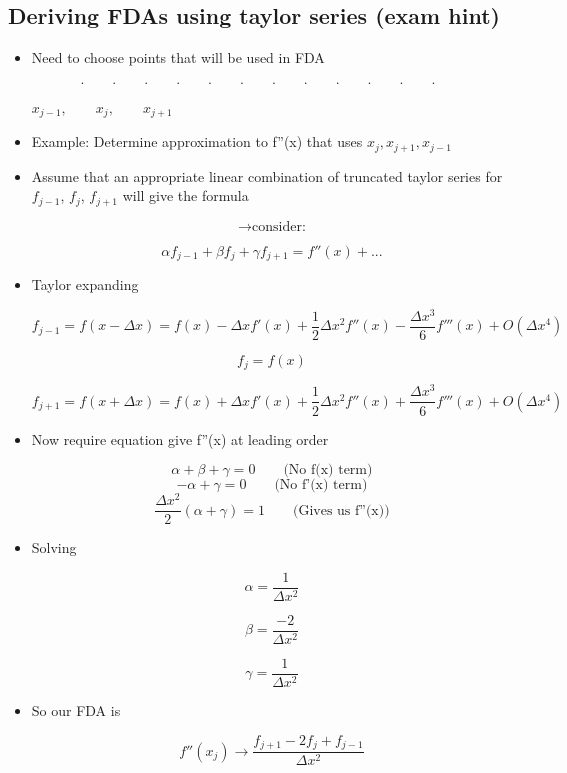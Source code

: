 \subsection{Deriving FDAs using taylor series (exam hint)}
\begin{itemize}
    \item Need to choose points that will be used in FDA

    \[ . \qquad . \qquad . \qquad . \qquad . \qquad . \qquad . \qquad . \qquad . \qquad . \qquad . \qquad . \qquad \]

    $x_{j-1}, \qquad x_j, \qquad  x_{j+1}$

    \item Example: Determine approximation to f''(x) that uses $x_j, x_{j+1}, x_{j-1}$

    \item Assume that an appropriate linear combination of truncated taylor series for $f_{j-1}$, $f_j$, $f_{j+1}$ will give the formula 

    \[ \rightarrow \text{consider:} \]
    
    \begin{equation}
        \alpha f_{j-1} + \beta f_j + \gamma f_{j+1} = f''(x) + ...
    \end{equation}

    \item Taylor expanding 

    \[ f_{j-1} = f(x-\Delta x) = f(x) - \Delta xf'(x)+ \frac{1}{2} \Delta x^2 f''(x) - \frac{\Delta x^3}{6} f'''(x) + O(\Delta x^4)\]

    \[ f_j = f(x)\]

    \[ f_{j+1} = f(x+\Delta x) = f(x) + \Delta xf'(x)+ \frac{1}{2} \Delta x^2 f''(x) + \frac{\Delta x^3}{6} f'''(x) + O(\Delta x^4)\]

    \item Now require equation give f''(x) at leading order

    \[ \alpha + \beta + \gamma = 0 \qquad \text{(No f(x) term)}\]
    \[ -\alpha  + \gamma = 0 \qquad \text{(No f'(x) term)}\]
    \[\frac{\Delta x^2}{2}(\alpha + \gamma)=1 \qquad \text{(Gives us f''(x))}\]

    \item Solving

    \[\alpha = \frac{1}{\Delta x^2}\]

    \[ \beta = \frac{-2}{\Delta x^2}\]

    \[ \gamma = \frac{1}{\Delta x^2}\]

    \item So our FDA is 

    \[ f''(x_j) \rightarrow \frac{f_{j+1}-2f_j + f_{j-1}}{\Delta x^2}\]
    
\end{itemize}



